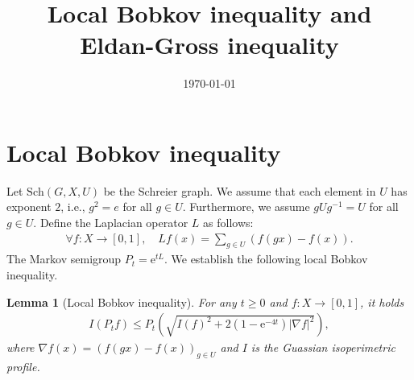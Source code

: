 \documentclass[11pt]{article}
\title{Local Bobkov inequality and Eldan-Gross inequality}
\date{\today}
\theoremstyle{plain}
\newtheorem{lemma}[theorem]{Lemma}
\theoremstyle{definition}
\theoremstyle{remark}
\newcommand{\e}{\mathrm{e}}
\newcommand{\tuple}[1]{\left(#1\right)}
\newcommand{\tp}{\tuple}
\newcommand{\abs}[1]{\left\vert#1\right\vert}
\begin{document}
\maketitle

\section{Local Bobkov inequality}
Let $\mathrm{Sch}(G,X,U)$ be the Schreier graph. We assume that each element in $U$ has exponent $2$, i.e., $g^2 = e$ for all $g \in U$. Furthermore, we assume $g U g^{-1} = U$ for all $g \in U$.
Define the Laplacian operator $L$ as follows:
\begin{align*}
    \forall f:X \to [0,1],\quad Lf(x) = \sum_{g \in U} \tp{f(g x) - f(x)}.
\end{align*}
The Markov semigroup $P_t = \e^{tL}$. We establish the following local Bobkov inequality.
\begin{lemma}[Local Bobkov inequality]
    For any $t \ge 0$ and $f: X \to [0,1]$, it holds
    \begin{align*}
        I(P_t f) \le P_t \tp{\sqrt{I(f)^2 + 2(1-\e^{-4t}) \abs{\nabla f}^2}},
    \end{align*}
    where $\nabla f(x) = (f(g x) - f(x))_{g \in U}$ and $I$ is the Guassian isoperimetric profile.
\end{lemma}
\end{document}
